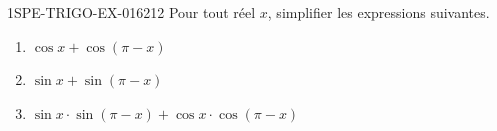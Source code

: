 \begin{exercice}{1SPE-TRIGO-EX-016}{2}{12}
Pour tout réel $x$, simplifier les expressions suivantes.
\begin{enumerate}
  \item $\cos x + \cos(\pi - x)$
  \item $\sin x + \sin(\pi - x)$
  \item $\sin x \cdot \sin(\pi - x) + \cos x \cdot \cos(\pi - x)$
\end{enumerate}
\end{exercice}

